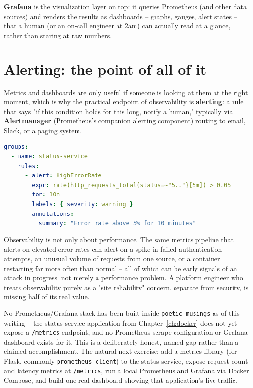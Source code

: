 \documentclass[11pt,twoside,openright]{book}
\begin{document}
\textbf{Grafana} is the visualization layer on top: it queries Prometheus (and other data
sources) and renders the results as dashboards -- graphs, gauges, alert states -- that a
human (or an on-call engineer at 2am) can actually read at a glance, rather than staring at
raw numbers.

\section{Alerting: the point of all of it}

Metrics and dashboards are only useful if someone is looking at them at the right moment,
which is why the practical endpoint of observability is \textbf{alerting}: a rule that says
"if this condition holds for this long, notify a human," typically via
\textbf{Alertmanager} (Prometheus's companion alerting component) routing to email, Slack,
or a paging system.

\begin{lstlisting}[language=yaml]
groups:
  - name: status-service
    rules:
      - alert: HighErrorRate
        expr: rate(http_requests_total{status=~"5.."}[5m]) > 0.05
        for: 10m
        labels: { severity: warning }
        annotations:
          summary: "Error rate above 5% for 10 minutes"
\end{lstlisting}

\begin{note}
Observability is not only about performance. The same metrics pipeline that alerts on
elevated error rates can alert on a spike in failed authentication attempts, an unusual
volume of requests from one source, or a container restarting far more often than normal
-- all of which can be early signals of an attack in progress, not merely a performance
problem. A platform engineer who treats observability purely as a "site reliability"
concern, separate from security, is missing half of its real value.
\end{note}

\begin{gap}
No Prometheus/Grafana stack has been built inside \texttt{poetic-musings} as of this
writing -- the status-service application from Chapter~\ref{ch:docker} does not yet expose
a \texttt{/metrics} endpoint, and no Prometheus scrape configuration or Grafana dashboard
exists for it. This is a deliberately honest, named gap rather than a claimed
accomplishment. The natural next exercise: add a metrics library (for Flask, commonly
\texttt{prometheus\_client}) to the status-service, expose request-count and latency
metrics at \texttt{/metrics}, run a local Prometheus and Grafana via Docker Compose, and
build one real dashboard showing that application's live traffic.
\end{gap}
\end{document}
